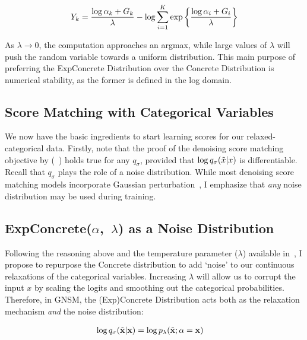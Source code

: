 \begin{equation}
    Y_k = \frac{\log \alpha_k + G_k}{\lambda} - \log \sum_{i=1}^{K} \exp \left\{ {\frac{\log \alpha_i + G_i}{\lambda}} \right\}
    \label{eq:log_concrete}
\end{equation}

As $\lambda \rightarrow 0$, the computation approaches an argmax, while large values of $\lambda$ will push the random variable towards a uniform distribution. This main purpose of preferring the ExpConcrete Distribution over the Concrete Distribution is numerical stability, as the former is defined in the log domain.


\subsection*{Score Matching with Categorical Variables}

We now have the basic ingredients to start learning scores for our relaxed-categorical data.
Firstly, note that the proof of the denoising score matching objective by \cite{vincent2011connection} (~) holds true for any $q_\sigma$, provided that $\log q_{\sigma}(\Tilde{x} |x)$ is differentiable.
Recall that $q_\sigma$ plays the role of a noise distribution. While most denoising score matching models incorporate Gaussian perturbation~\cite{Song2019,song2020score,vincent2011connection}, I emphasize that \textit{any} noise distribution may be used during training.

\subsection*{ExpConcrete($\alpha$,~$\lambda$) as a Noise Distribution}
\label{combine}
Following the reasoning above and the temperature parameter ($\lambda$) available in~, I propose to repurpose the Concrete distribution to add `noise' to our continuous relaxations of the categorical variables. Increasing $\lambda$ will allow us to corrupt the input $x$ by scaling the logits and smoothing out the categorical probabilities. Therefore, in GNSM, the (Exp)Concrete Distribution acts both as the relaxation mechanism \textit{and} the noise distribution:

\begin{align*}
     \log q_{\sigma}(\Tilde{\mathbf{x}} | \mathbf{x})  &= \log p_{\lambda}(\Tilde{\mathbf{x}}; \alpha=\mathbf{x})
\end{align*}

